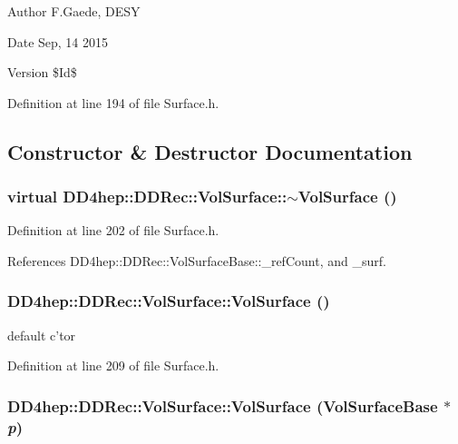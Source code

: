 \begin{DoxyAuthor}{Author}
F.Gaede, DESY 
\end{DoxyAuthor}
\begin{DoxyDate}{Date}
Sep, 14 2015 
\end{DoxyDate}
\begin{DoxyVersion}{Version}
\$Id\$ 
\end{DoxyVersion}


Definition at line 194 of file Surface.h.

\subsection{Constructor \& Destructor Documentation}
\hypertarget{class_d_d4hep_1_1_d_d_rec_1_1_vol_surface_a2e875aa0d3e673d9c07f6047f3e7d0cb}{
\subsubsection[{$\sim$VolSurface}]{\setlength{\rightskip}{0pt plus 5cm}virtual DD4hep::DDRec::VolSurface::$\sim$VolSurface ()}}
\label{class_d_d4hep_1_1_d_d_rec_1_1_vol_surface_a2e875aa0d3e673d9c07f6047f3e7d0cb}


Definition at line 202 of file Surface.h.

References DD4hep::DDRec::VolSurfaceBase::\_\-refCount, and \_\-surf.\hypertarget{class_d_d4hep_1_1_d_d_rec_1_1_vol_surface_a4f1411058c69312c7107b4c5d5e5fc28}{
\subsubsection[{VolSurface}]{\setlength{\rightskip}{0pt plus 5cm}DD4hep::DDRec::VolSurface::VolSurface ()}}
\label{class_d_d4hep_1_1_d_d_rec_1_1_vol_surface_a4f1411058c69312c7107b4c5d5e5fc28}


default c'tor 

Definition at line 209 of file Surface.h.\hypertarget{class_d_d4hep_1_1_d_d_rec_1_1_vol_surface_a95bfde0154e3651826df0760b2aba552}{
\subsubsection[{VolSurface}]{\setlength{\rightskip}{0pt plus 5cm}DD4hep::DDRec::VolSurface::VolSurface ({\bf VolSurfaceBase} $\ast$ {\em p})}}
\label{class_d_d4hep_1_1_d_d_rec_1_1_vol_surface_a95bfde0154e3651826df0760b2aba552}


